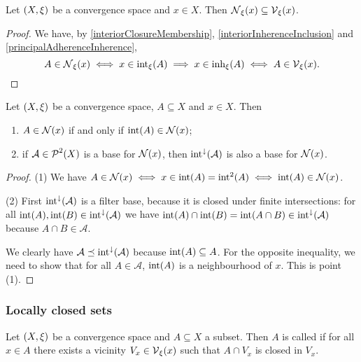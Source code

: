 \begin{lemma}
Let $\sSet{X,\xi}$ be a convergence space and $x\in X$. Then $\operatorname{\mathcal{N}}_\xi(x) \subseteq \operatorname{\mathcal{V}}_\xi(x)$.
\end{lemma}
\begin{proof}
We have, by \ref{interiorClosureMembership}, \ref{interiorInherenceInclusion} and \ref{principalAdherenceInherence},
\[ A \in \operatorname{\mathcal{N}}_\xi(x) \iff x\in \operatorname{int}_\xi(A) \implies x\in \operatorname{inh}_\xi(A) \iff A\in\operatorname{\mathcal{V}}_\xi(x). \]
\end{proof}

\begin{lemma} \label{interiorModificationNeighbourhoods}
Let $\sSet{X,\xi}$ be a convergence space, $A\subseteq X$ and $x\in X$. Then
\begin{enumerate}
\item $A\in\operatorname{\mathcal{N}}(x)$ \textup{if and only if} $\operatorname{int}(A)\in\operatorname{\mathcal{N}}(x)$;
\item if $\mathcal{A}\in\operatorname{\mathcal{P}}^2(X)$ is a base for $\operatorname{\mathcal{N}}(x)$, then $\operatorname{int}^{\downarrow}(\mathcal{A})$ is also a base for $\operatorname{\mathcal{N}}(x)$.
\end{enumerate}
\end{lemma}
\begin{proof}
(1) We have $A\in\operatorname{\mathcal{N}}(x) \iff x\in \operatorname{int}(A) = \operatorname{int}^2(A) \iff \operatorname{int}(A) \in \operatorname{\mathcal{N}}(x)$.

(2) First $\operatorname{int}^{\downarrow}(\mathcal{A})$ is a filter base, because it is closed under finite intersections: for all $\operatorname{int}(A),\operatorname{int}(B)\in \operatorname{int}^{\downarrow}(\mathcal{A})$ we have $\operatorname{int}(A)\cap\operatorname{int}(B) = \operatorname{int}(A\cap B) \in \operatorname{int}^{\downarrow}(\mathcal{A})$ because $A\cap B \in \mathcal{A}$.

We clearly have $\mathcal{A} \preceq \operatorname{int}^{\downarrow}(\mathcal{A})$ because $\operatorname{int}(A) \subseteq A$. For the opposite inequality, we need to show that for all $A\in \mathcal{A}$, $\operatorname{int}(A)$ is a neighbourhood of $x$. This is point (1).
\end{proof}

\subsubsection{Locally closed sets}
\begin{definition}
Let $\sSet{X,\xi}$ be a convergence space and $A\subseteq X$ a subset. Then $A$ is called  if for all $x\in A$ there exists a vicinity $V_x\in\operatorname{\mathcal{V}}_\xi(x)$ such that $A\cap V_x$ is closed in $V_x$.
\end{definition}

